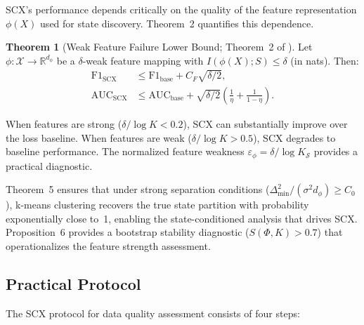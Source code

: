 \documentclass[twocolumn]{article}
\theoremstyle{definition}
\newtheorem{theorem}{Theorem}
\begin{document}
SCX's performance depends critically on the quality of the feature representation $\phi(X)$ used for state discovery. Theorem~2 quantifies this dependence.

\begin{theorem}[Weak Feature Failure Lower Bound; Theorem~2 of \cite{paperI}]
\label{thm:weakfeature}
Let $\phi: \mathcal{X} \to \mathbb{R}^{d_\phi}$ be a $\delta$-weak feature mapping with $I(\phi(X); S) \leq \delta$ (in nats). Then:
\begin{align}
\mathrm{F1}_{\mathrm{SCX}} &\leq \mathrm{F1}_{\mathrm{base}} + C_F\sqrt{\delta/2}, \\
\mathrm{AUC}_{\mathrm{SCX}} &\leq \mathrm{AUC}_{\mathrm{base}} + \sqrt{\delta/2}\left(\frac{1}{\eta} + \frac{1}{1-\eta}\right).
\end{align}
\end{theorem}

When features are strong ($\delta/\log K < 0.2$), SCX can substantially improve over the loss baseline. When features are weak ($\delta/\log K > 0.5$), SCX degrades to baseline performance. The normalized feature weakness $\varepsilon_\phi = \delta / \log K_{\mathcal{S}}$ provides a practical diagnostic.

Theorem~5 ensures that under strong separation conditions ($\Delta_{\min}^2 / (\sigma^2 d_\phi) \geq C_0$), k-means clustering recovers the true state partition with probability exponentially close to~1, enabling the state-conditioned analysis that drives SCX. Proposition~6 provides a bootstrap stability diagnostic ($S(\Phi, K) > 0.7$) that operationalizes the feature strength assessment.

\subsection{Practical Protocol}

The SCX protocol for data quality assessment consists of four steps:
\end{document}
